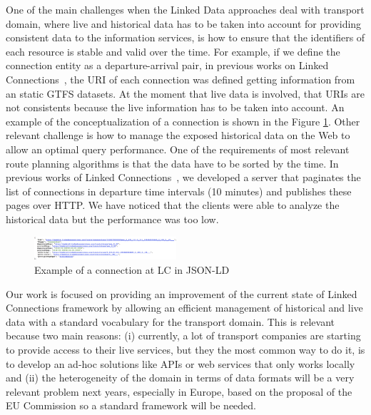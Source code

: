 \documentclass[sw]{iosart2x}
\begin{document}
One of the main challenges when the Linked Data approaches deal with transport domain, where live and historical data has to be taken into account for providing consistent data to the information services, is how to ensure that the identifiers of each resource is stable and valid over the time. For example, if we define the connection entity as a departure-arrival pair, in previous works on Linked Connections~\cite{colpaert2015intermodal}, the URI of each connection was defined getting information from an static GTFS datasets. At the moment that live data is involved, that URIs are not consistents because the live information has to be taken into account. An example of the conceptualization of a connection is shown in the Figure \ref{fig:connection}. Other relevant challenge is how to manage the exposed historical data on the Web to allow an optimal query performance. One of the requirements of most relevant route planning algorithms is that the data have to be sorted by the time. In previous works of Linked Connections~\cite{rojas2017providing}, we developed a server that paginates the list of connections in departure time intervals (10 minutes) and publishes these pages over HTTP. We have noticed that the clients were able to analyze the historical data but the performance was too low.

\begin{figure}[t]
	\includegraphics[width=0.47\textwidth]{images/connection.png}
	\caption{Example of a connection at LC in JSON-LD}\label{fig:connection}
\end{figure}

Our work is focused on providing an improvement of the current state of Linked Connections framework by allowing an efficient management of historical and live data with a standard vocabulary for the transport domain. This is relevant because two main reasons: (i) currently, a lot of transport companies are starting to provide access to their live services, but they the most common way to do it, is to develop an ad-hoc solutions like APIs or web services that only works locally~\cite{colpaert2016public} and (ii) the heterogeneity of the domain in terms of data formats will be a very relevant problem next years, especially in Europe, based on the proposal of the EU Commission so a standard framework will be needed.  
\end{document}
